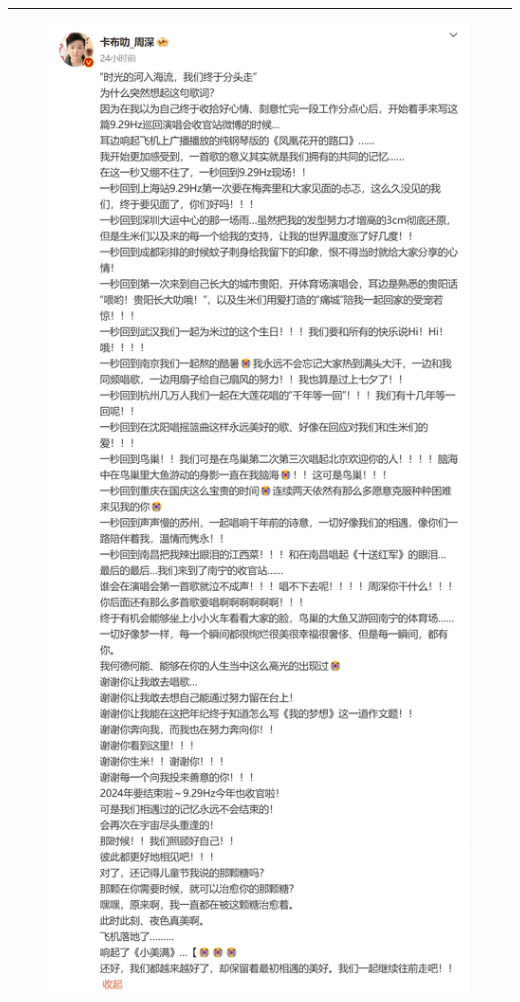 \documentclass[]{ctexbook}
\begin{document}
\begin{center}\rule{0.5\linewidth}{0.5pt}\end{center}

\begin{figure}

{\centering \includegraphics{img/weibo/nanning-20241207} 

}

\end{figure}
\end{document}
